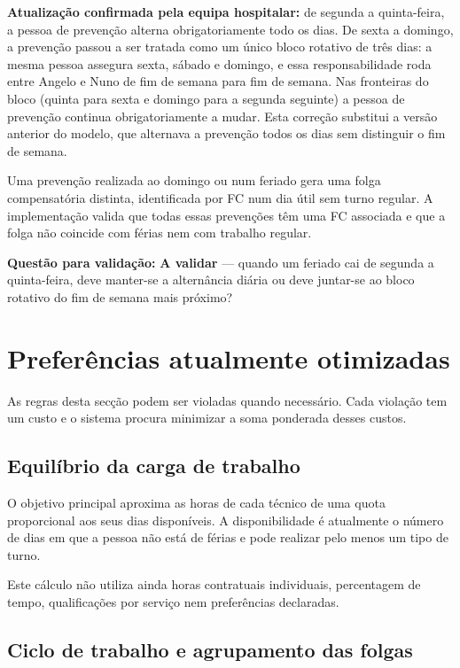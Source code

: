 \documentclass[11pt,a4paper]{article}
\newcommand{\validar}{\textcolor{blue!70!black}{\textbf{A validar}}}
\begin{document}
\textbf{Atualização confirmada pela equipa hospitalar:} de segunda a
quinta-feira, a pessoa de prevenção alterna obrigatoriamente todo os dias. De
sexta a domingo, a prevenção passou a ser tratada como um único bloco rotativo
de três dias: a mesma pessoa assegura sexta, sábado e domingo, e essa
responsabilidade roda entre Angelo e Nuno de fim de semana para fim de semana.
Nas fronteiras do bloco (quinta para sexta e domingo para a segunda seguinte) a
pessoa de prevenção continua obrigatoriamente a mudar. Esta correção substitui a
versão anterior do modelo, que alternava a prevenção todos os dias sem
distinguir o fim de semana.

Uma prevenção realizada ao domingo ou num feriado gera uma folga compensatória
distinta, identificada por FC num dia útil sem turno regular. A implementação
valida que todas essas prevenções têm uma FC associada e que a folga não coincide
com férias nem com trabalho regular.

\textbf{Questão para validação:} \validar{} --- quando um feriado cai de
segunda a quinta-feira, deve manter-se a alternância diária ou deve juntar-se
ao bloco rotativo do fim de semana mais próximo?

\section{Preferências atualmente otimizadas}

As regras desta secção podem ser violadas quando necessário. Cada violação tem
um custo e o sistema procura minimizar a soma ponderada desses custos.

\subsection{Equilíbrio da carga de trabalho}

O objetivo principal aproxima as horas de cada técnico de uma quota proporcional
aos seus dias disponíveis. A disponibilidade é atualmente o número de dias em
que a pessoa não está de férias e pode realizar pelo menos um tipo de turno.

Este cálculo não utiliza ainda horas contratuais individuais, percentagem de
tempo, qualificações por serviço nem preferências declaradas.

\subsection{Ciclo de trabalho e agrupamento das folgas}
\end{document}
